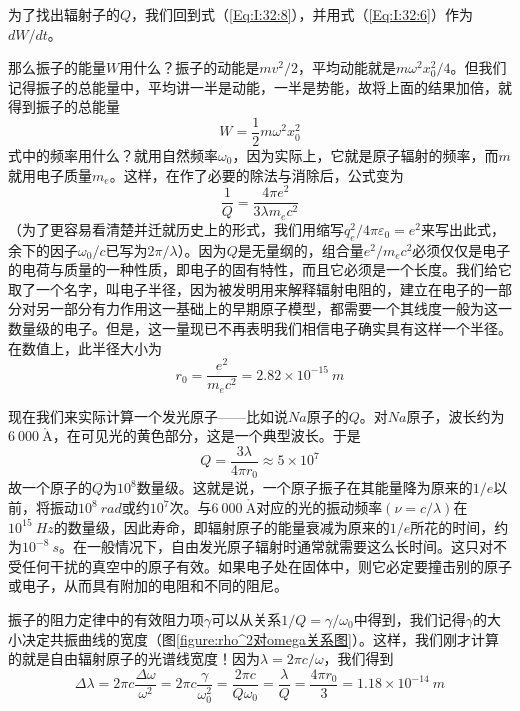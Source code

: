 为了找出辐射子的$Q$，我们回到式（\ref{Eq:I:32:8}），并用式（\ref{Eq:I:32:6}）作为$dW/dt$。

那么振子的能量$W$用什么？振子的动能是$mv^2/2$，平均动能就是$m\omega^2x_0^2/4$。但我们记得振子的总能量中，平均讲一半是动能，一半是势能，故将上面的结果加倍，就得到振子的总能量
\begin{equation}
    \label{Eq:I:32:9}
    W = \frac{1}{2}m\omega^2x_0^2
\end{equation}
式中的频率用什么？就用自然频率$\omega_0$，因为实际上，它就是原子辐射的频率，而$m$就用电子质量$m_e$。这样，在作了必要的除法与消除后，公式变为
\begin{equation}
    \label{Eq:I:32:10}
    \frac{1}{Q} = \frac{4\pi e^2}{3\lambda m_ec^2}
\end{equation}
（为了更容易看清楚并迁就历史上的形式，我们用缩写$q_e^2/4\pi\varepsilon_0=e^2$来写出此式，余下的因子$\omega_0/c$已写为$2\pi/\lambda$）。因为$Q$是无量纲的，组合量$e^2/m_ec^2$必须仅仅是电子的电荷与质量的一种性质，即电子的固有特性，而且它必须是一个长度。我们给它取了一个名字，叫电子半径，因为被发明用来解释辐射电阻的，建立在电子的一部分对另一部分有力作用这一基础上的早期原子模型，都需要一个其线度一般为这一数量级的电子。但是，这一量现已不再表明我们相信电子确实具有这样一个半径。在数值上，此半径大小为
\begin{equation}
    \label{Eq:I:32:11}
    r_0=\frac{e^2}{m_ec^2} = 2.82 \times 10^{-15}~m
\end{equation}

现在我们来实际计算一个发光原子——比如说$Na$原子的$Q$。对$Na$原子，波长约为$6~000~\mathring{\text{A}}$，在可见光的黄色部分，这是一个典型波长。于是
\begin{equation}
    \label{Eq:I:32:12}
    Q=\frac{3\lambda}{4\pi r_0} \approx 5 \times 10^7
\end{equation}
故一个原子的$Q$为$10^8$数量级。这就是说，一个原子振子在其能量降为原来的$1/e$以前，将振动$10^8~rad$或约$10^7$次。与$6~000~\mathring{\text{A}}$对应的光的振动频率$(\nu=c/\lambda)$在$10^{15}~Hz$的数量级，因此寿命，即辐射原子的能量衰减为原来的$1/e$所花的时间，约为$10^{-8}~s$。在一般情况下，自由发光原子辐射时通常就需要这么长时间。这只对不受任何干扰的真空中的原子有效。如果电子处在固体中，则它必定要撞击别的原子或电子，从而具有附加的电阻和不同的阻尼。

振子的阻力定律中的有效阻力项$\gamma$可以从关系$1/Q=\gamma/\omega_0$中得到，我们记得$\gamma$的大小决定共振曲线的宽度（图\ref{figure:rho^2对omega关系图}）。这样，我们刚才计算的就是自由辐射原子的光谱线宽度！因为$\lambda=2\pi c/\omega$，我们得到
\begin{equation}
    \label{Eq:I:32:13}
    \Delta\lambda = 2\pi c \frac{\Delta\omega}{\omega^2} = 2\pi c \frac{\gamma}{\omega_0^2} = \frac{2\pi c}{Q\omega_0} = \frac{\lambda}{Q} = \frac{4\pi r_0}{3} = 1.18 \times 10^{-14}~m
\end{equation}

